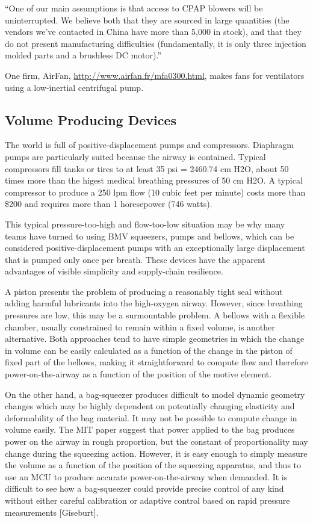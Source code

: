 \documentclass[conference]{article}
\begin{document}
``One of our main assumptions is that access to CPAP blowers will be uninterrupted. We believe both that they are sourced in large quantities (the vendors we’ve contacted in China have more than 5,000 in stock), and that they do not present manufacturing difficulties (fundamentally, it is only three injection molded parts and a brushless DC motor).''

One firm, AirFan, \url{http://www.airfan.fr/mfa0300.html}, makes fans for ventilators using a low-inertial centrifugal pump.

\subsection{Volume Producing Devices}

The world is full of positive-displacement pumps and compressors. Diaphragm pumps are particularly suited because
the airway is contained. Typical compressors fill tanks or tires to at least 35 psi = 2460.74 cm H2O,
about 50 times more than the higest medical breathing pressures of 50 cm H2O. A typical compressor to produce a 250 lpm
flow (10 cubic feet per minute) costs more than \$200 and requires more than 1 horesepower (746 watts).

This typical pressure-too-high and flow-too-low situation may be why
many teams have turned to using BMV squeezers, pumps and bellows,
which can be considered positive-displacement pumps with an exceptionally
large displacement that is pumped only once per breath.
These devices have the apparent advantages of visible simplicity and
supply-chain resilience.

A piston presents the problem of producing a reasonably tight seal
without adding harmful lubricants into the high-oxygen airway.
However, since breathing pressures are low, this may be a surmountable problem.
A bellows with a flexible chamber, usually constrained
to remain within a fixed volume, is another alternative.  Both approaches tend to have simple geometries in which the
change in volume can be easily calculated as a function of the change in the piston of fixed part of the bellows, making
it straightforward to compute flow and therefore power-on-the-airway as a function of the position of the motive element.

On the other hand, a bag-squeezer produces difficult to model dynamic
geometry changes which may be highly dependent on potentially
changing elasticity and deformability of the bag material.
It may not be possible to compute change in volume easily.
The MIT paper suggest that power applied to the bag produces
power on the airway in rough proportion, but the constant of proportionality
may change during the squeezing action.
However, it is easy enough to simply measure the volume as a function of
the position of the squeezing apparatus, and thus to use
an MCU to produce accurate power-on-the-airway when demanded.
It is difficult to see how a bag-squeezer could provide precise control
of any kind without either careful calibration
or adaptive control based on rapid pressure measurements [Giseburt].
\end{document}
